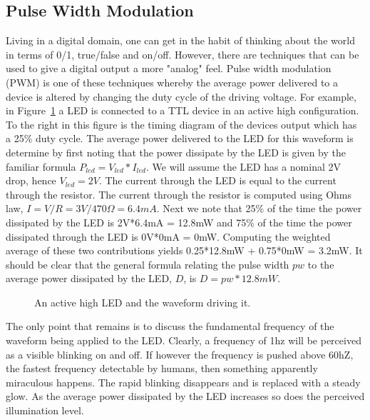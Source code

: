 \subsection{Pulse Width Modulation}
Living in a digital domain, one can get in the habit of thinking about
the world in terms of 0/1, true/false and on/off.  However, there are
techniques that can be used to  give a digital output a more "analog"
feel.  Pulse width modulation (PWM) is one of these techniques whereby
the average power delivered to a device is altered by changing the 
duty cycle of the driving voltage.  For example, in Figure~\ref{fig:pulse}
a LED is connected to a TTL device in an active high configuration.  To the
right in this figure is the timing diagram of the devices output which has
a 25\% duty cycle.  The average power delivered to the LED for
this waveform is determine by first noting that the power dissipate by
the LED is given by the familiar formula $P_{led} = V_{led}*I_{led}$.  
We will assume the LED has a nominal 2V drop, hence $V_{led}=2V$.  The current
through the LED is equal to the current through the resistor.  The current
through the resistor is computed using Ohms law, $I=V/R = 3V/470\Omega = 6.4mA$.
Next we note that 25\% of the time the power dissipated by the LED is
2V*6.4mA = 12.8mW and 75\% of the time the power dissipated through the LED
is 0V*0mA = 0mW.  Computing the weighted average of these two contributions
yields 0.25*12.8mW + 0.75*0mW = 3.2mW.  It should be clear that the general
formula relating the pulse width $pw$ to the average power dissipated by the 
LED, $D$, is $D = pw*12.8mW$.  

\begin{figure}[ht]
\caption{An active high LED and the waveform driving it.}
\label{fig:pulse}
\end{figure}

The only point that remains is to discuss the fundamental frequency of
the waveform being applied to the LED.  Clearly, a frequency of 1hz
will be perceived as a visible blinking on and off.  If however the 
frequency is pushed above 60hZ, the fastest frequency detectable by humans,
then something apparently miraculous happens.  The rapid blinking disappears
and is replaced with a steady glow.  As the average power dissipated by the
LED increases so does the perceived illumination level.



